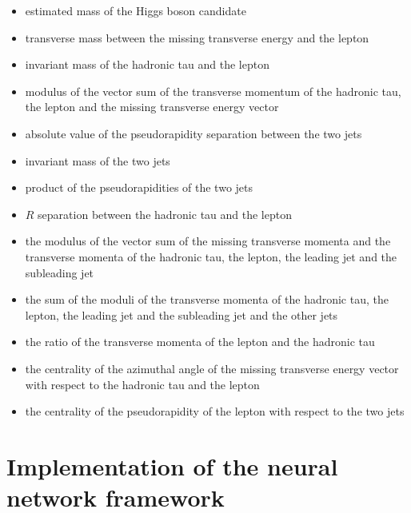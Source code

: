 \documentclass[12pt]{article}
\begin{document}
\begin{itemize}
  \item estimated mass of the Higgs boson candidate
  \item transverse mass between the missing transverse energy and the lepton
  \item invariant mass of the hadronic tau and the lepton
  \item modulus of the vector sum of the transverse momentum of the hadronic tau, the lepton and the missing 
	transverse energy vector
  \item absolute value of the pseudorapidity separation between the two jets
  \item invariant mass of the two jets
  \item product of the pseudorapidities of the two jets
  \item $R$ separation between the hadronic tau and the lepton
  \item the modulus of the vector sum of the missing transverse momenta and the transverse momenta of the 
	hadronic tau, the lepton, the leading jet and the subleading jet
  \item the sum of the moduli of the transverse momenta of the hadronic tau, the lepton, the leading jet
	and the subleading jet and the other jets
  \item the ratio of the transverse momenta of the lepton and the hadronic tau
  \item the centrality of the azimuthal angle of the missing transverse energy vector with respect to the 
	hadronic tau and the lepton
  \item the centrality of the pseudorapidity of the lepton with respect to the two jets
\end{itemize}
\pagebreak

\section{Implementation of the neural network framework}
\end{document}
